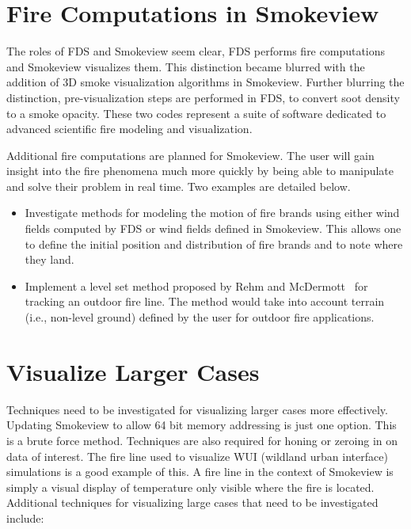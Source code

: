 \documentclass[11pt,twoside]{book}
\begin{document}
%
%

\section{Fire Computations in Smokeview}
The roles of FDS and Smokeview seem clear, FDS performs fire
computations and Smokeview visualizes them. This distinction
became blurred with the addition of 3D smoke visualization
algorithms in Smokeview. Further blurring the distinction,
pre-visualization steps are performed in FDS, to convert soot
density to a smoke opacity. These two codes represent a suite of
software dedicated to advanced scientific fire modeling and
visualization.

Additional fire computations are planned for Smokeview.  The user
will gain insight into the fire phenomena much more quickly by
being able to manipulate and solve their problem in real time. Two
examples are detailed below.

\begin{itemize}
\item  Investigate methods for modeling the motion of fire brands
using either wind fields computed by FDS or wind fields defined in
Smokeview. This allows one to define the initial position and
distribution of fire brands and to note where they land.

\item Implement a level set method proposed by Rehm and
McDermott~\cite{Rehm:LevelSet} for tracking an outdoor fire line.  The
method would take into account terrain (i.e., non-level
ground) defined by the user for outdoor fire applications.
\end{itemize}

%
%

\section{Visualize Larger Cases}
Techniques need to be investigated for visualizing larger cases
more effectively.  Updating Smokeview to allow 64 bit memory
addressing is just one option.  This is a brute force method.
Techniques are also required for honing or zeroing in on data of
interest.  The fire line used to visualize WUI (wildland urban
interface) simulations is a good example of this.  A fire line in
the context of Smokeview is simply a visual display of temperature
only visible where the fire is located.  Additional techniques for
visualizing large cases that need to be investigated include:
\end{document}
